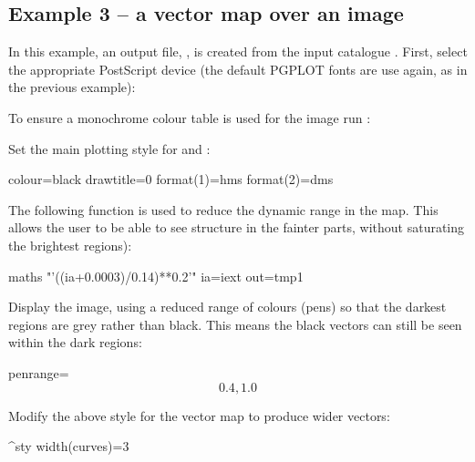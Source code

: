 \subsection{ Example 3 -- a vector map over an image}
\label{section:kappa-example3}


In this example, an output file, , is created from the input
catalogue . First, select the appropriate PostScript
device (the default PGPLOT fonts are use again, as in the previous example):

\begin{terminalv}
\end{terminalv}


To ensure a monochrome colour table is used for the image run
:

\begin{terminalv}
\end{terminalv}


Set the main plotting style for  and
:

\begin{terminalv}
colour=black
drawtitle=0
format(1)=hms
format(2)=dms
\end{terminalv}


The following function is used to reduce the dynamic range in the map. This
allows the user to be able to see structure in the fainter parts, without saturating the
brightest regions):

\begin{terminalv}
maths "'((ia+0.0003)/0.14)**0.2'" ia=iext out=tmp1
\end{terminalv}


Display the image, using a reduced range of colours (pens) so
that the darkest regions are grey rather than black.  This means the
black vectors can still be seen within the dark regions:

\begin{terminalv}
        penrange=\[0.4,1.0\]
\end{terminalv}


Modify the above style for the vector map to produce wider vectors:

\begin{terminalv}
^sty
width(curves)=3
\end{terminalv}


